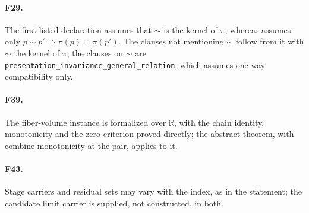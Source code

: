 \paragraph{F29.} The first listed declaration assumes that \(\sim\) is
the kernel of \(\pi\), whereas  assumes only
\(p\sim p'\Rightarrow\pi(p)=\pi(p')\).  The clauses not mentioning
\(\sim\) follow from it with \(\sim\) the kernel of \(\pi\); the clauses on
\(\sim\) are \texttt{presentation\_invariance\_general\_relation}, which
assumes one-way compatibility only.

\paragraph{F39.} The fiber-volume instance is formalized over \(\mathbb
R\), with the chain identity, monotonicity and the zero criterion proved
directly; the abstract theorem, with combine-monotonicity at the pair,
applies to it.

\paragraph{F43.} Stage carriers and residual sets may vary with the
index, as in the statement; the candidate limit carrier is supplied, not
constructed, in both.

